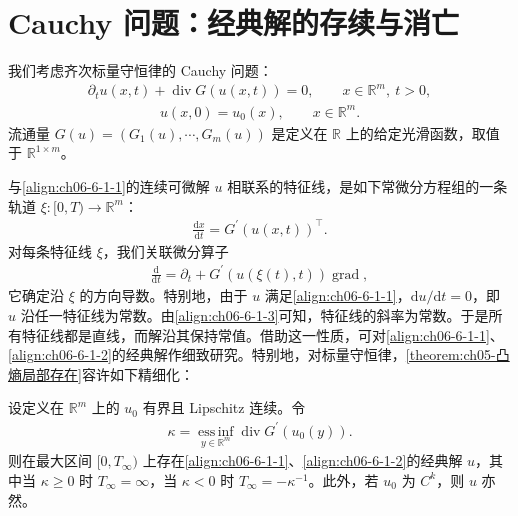 \documentclass[../../main.tex]{subfiles}
\begin{document}
\section{Cauchy 问题：经典解的存续与消亡}\label{section:ch06-cauchy问题经典解}

我们考虑齐次标量守恒律的 Cauchy 问题：
\begin{align}
\partial_{t}u(x,t)+\operatorname{div}G(u(x,t))=0,\qquad x\in\mathbb{R}^{m},\ t>0,
\label{align:ch06-6-1-1}
\end{align}
\begin{align}
u(x,0)=u_{0}(x),\qquad x\in\mathbb{R}^{m}.
\label{align:ch06-6-1-2}
\end{align}
流通量 $G(u)=(G_{1}(u),\cdots,G_{m}(u))$ 是定义在 $\mathbb{R}$ 上的给定光滑函数，取值于 $\mathbb{R}^{1\times m}$。

与\eqref{align:ch06-6-1-1}的连续可微解 $u$ 相联系的特征线，是如下常微分方程组的一条轨道 $\xi\colon[0,T)\to\mathbb{R}^{m}$：
\begin{align}
\frac{\mathrm{d}x}{\mathrm{d}t}=G^{\prime}(u(x,t))^{\top}.
\label{align:ch06-6-1-3}
\end{align}
对每条特征线 $\xi$，我们关联微分算子
\begin{align}
\frac{\mathrm{d}}{\mathrm{d}t}=\partial_{t}+G^{\prime}(u(\xi(t),t))\operatorname{grad},
\label{align:ch06-6-1-4}
\end{align}
它确定沿 $\xi$ 的方向导数。特别地，由于 $u$ 满足\eqref{align:ch06-6-1-1}，$\mathrm{d}u/\mathrm{d}t=0$，即 $u$ 沿任一特征线为常数。由\eqref{align:ch06-6-1-3}可知，特征线的斜率为常数。于是所有特征线都是直线，而解沿其保持常值。借助这一性质，可对\eqref{align:ch06-6-1-1}、\eqref{align:ch06-6-1-2}的经典解作细致研究。特别地，对标量守恒律，\cref{theorem:ch05-凸熵局部存在}容许如下精细化：


\begin{theorem}\label{theorem:ch06-6-1-1}
设定义在 $\mathbb{R}^{m}$ 上的 $u_{0}$ 有界且 Lipschitz 连续。令
\begin{align}
\kappa=\operatorname*{ess\,inf}_{y\in\mathbb{R}^{m}}\operatorname{div}G^{\prime}(u_{0}(y)).
\label{align:ch06-6-1-5}
\end{align}
则在最大区间 $[0,T_{\infty})$ 上存在\eqref{align:ch06-6-1-1}、\eqref{align:ch06-6-1-2}的经典解 $u$，其中当 $\kappa\geqslant 0$ 时 $T_{\infty}=\infty$，当 $\kappa<0$ 时 $T_{\infty}=-\kappa^{-1}$。此外，若 $u_{0}$ 为 $C^{k}$，则 $u$ 亦然。
\end{theorem}
\end{document}
